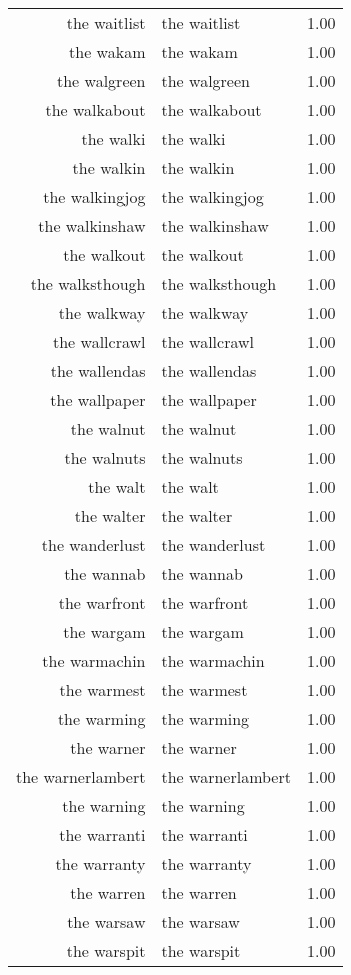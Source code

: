 \begin{table}[ht]
\begin{tabular}{rlr}
  the waitlist & the waitlist & 1.00 \\ 
  the wakam & the wakam & 1.00 \\ 
  the walgreen & the walgreen & 1.00 \\ 
  the walkabout & the walkabout & 1.00 \\ 
  the walki & the walki & 1.00 \\ 
  the walkin & the walkin & 1.00 \\ 
  the walkingjog & the walkingjog & 1.00 \\ 
  the walkinshaw & the walkinshaw & 1.00 \\ 
  the walkout & the walkout & 1.00 \\ 
  the walksthough & the walksthough & 1.00 \\ 
  the walkway & the walkway & 1.00 \\ 
  the wallcrawl & the wallcrawl & 1.00 \\ 
  the wallendas & the wallendas & 1.00 \\ 
  the wallpaper & the wallpaper & 1.00 \\ 
  the walnut & the walnut & 1.00 \\ 
  the walnuts & the walnuts & 1.00 \\ 
  the walt & the walt & 1.00 \\ 
  the walter & the walter & 1.00 \\ 
  the wanderlust & the wanderlust & 1.00 \\ 
  the wannab & the wannab & 1.00 \\ 
  the warfront & the warfront & 1.00 \\ 
  the wargam & the wargam & 1.00 \\ 
  the warmachin & the warmachin & 1.00 \\ 
  the warmest & the warmest & 1.00 \\ 
  the warming & the warming & 1.00 \\ 
  the warner & the warner & 1.00 \\ 
  the warnerlambert & the warnerlambert & 1.00 \\ 
  the warning & the warning & 1.00 \\ 
  the warranti & the warranti & 1.00 \\ 
  the warranty & the warranty & 1.00 \\ 
  the warren & the warren & 1.00 \\ 
  the warsaw & the warsaw & 1.00 \\ 
  the warspit & the warspit & 1.00 \\ 

\end{tabular}
\end{table}

